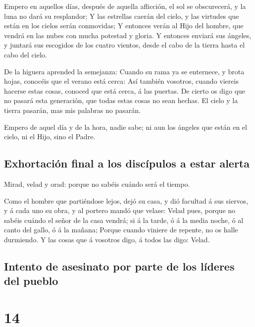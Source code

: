  Empero en aquellos días, después de aquella aflicción,
el sol se obscurecerá, y la luna no dará su resplandor; 
Y las estrellas caerán del cielo, y las virtudes que están en los cielos
serán conmovidas;  Y entonces verán al Hijo del hombre,
que vendrá en las nubes con mucha potestad y gloria.  Y
entonces enviará sus ángeles, y juntará sus escogidos de los cuatro
vientos, desde el cabo de la tierra hasta el cabo del cielo.

 De la higuera aprended la semejanza: Cuando su rama ya
se enternece, y brota hojas, conocéis que el verano está cerca:
 Así también vosotros, cuando viereis hacerse estas
cosas, conoced que está cerca, á las puertas.  De cierto
os digo que no pasará esta generación, que todas estas cosas no sean
hechas.  El cielo y la tierra pasarán, mas mis palabras
no pasarán.

 Empero de aquel día y de la hora, nadie sabe; ni aun los
ángeles que están en el cielo, ni el Hijo, sino el Padre.

\hypertarget{exhortaciuxf3n-final-a-los-discuxedpulos-a-estar-alerta}{%
\subsection{Exhortación final a los discípulos a estar
alerta}\label{exhortaciuxf3n-final-a-los-discuxedpulos-a-estar-alerta}}

 Mirad, velad y orad: porque no sabéis cuándo será el
tiempo.

 Como el hombre que partiéndose lejos, dejó su casa, y
dió facultad á sus siervos, y á cada uno su obra, y al portero mandó que
velase:  Velad pues, porque no sabéis cuándo el señor de
la casa vendrá; si á la tarde, ó á la media noche, ó al canto del gallo,
ó á la mañana;  Porque cuando viniere de repente, no os
halle durmiendo.  Y las cosas que á vosotros digo, á
todos las digo: Velad.

\hypertarget{intento-de-asesinato-por-parte-de-los-luxedderes-del-pueblo}{%
\subsection{Intento de asesinato por parte de los líderes del
pueblo}\label{intento-de-asesinato-por-parte-de-los-luxedderes-del-pueblo}}

\hypertarget{section-41-14}{%
\section{14}\label{section-41-14}}

